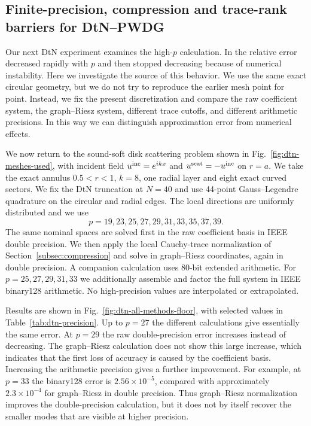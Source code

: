 \documentclass[pdflatex,sn-mathphys-num]{sn-jnl}
\theoremstyle{thmstyleone}
\theoremstyle{thmstyletwo}
\begin{document}
\subsection{Finite-precision, compression and trace-rank barriers for DtN--PWDG}\label{subsec:dtn-precision}
Our next DtN experiment examines the high-$p$ calculation.  In \cite{KapitaMonk2018} the relative error decreased rapidly with $p$ and then stopped decreasing because of numerical instability.  Here we investigate the source of this behavior.  We use the same exact circular geometry, but we do not try to reproduce the earlier mesh point for point.  Instead, we fix the present discretization and compare the raw coefficient system, the graph--Riesz system, different trace cutoffs, and different arithmetic precisions.  In this way we can distinguish approximation error from numerical effects.

We now return to the sound-soft disk scattering problem shown in Fig.~\ref{fig:dtn-meshes-used}, with incident field $u^{\rm inc}=e^{ikx}$ and $u^{\rm scat}=-u^{\rm inc}$ on $r=a$.  We take the exact annulus $0.5<r<1$, $k=8$, one radial layer and eight exact curved sectors.  We fix the DtN truncation at $N=40$ and use 44-point Gauss--Legendre quadrature on the circular and radial edges.  The local directions are uniformly distributed and we use
\[
 p=19,23,25,27,29,31,33,35,37,39.
\]
The same nominal spaces are solved first in the raw coefficient basis in IEEE double precision.  We then apply the local Cauchy-trace normalization of Section~\ref{subsec:compression} and solve in graph--Riesz coordinates, again in double precision.  A companion calculation uses 80-bit extended arithmetic.  For $p=25,27,29,31,33$ we additionally assemble and factor the full system in IEEE binary128 arithmetic.  No high-precision values are interpolated or extrapolated.

Results are shown in Fig.~\ref{fig:dtn-all-methods-floor}, with selected values in Table~\ref{tab:dtn-precision}.  Up to $p=27$ the different calculations give essentially the same error.  At $p=29$ the raw double-precision error increases instead of decreasing.  The graph--Riesz calculation does not show this large increase, which indicates that the first loss of accuracy is caused by the coefficient basis.  Increasing the arithmetic precision gives a further improvement.  For example, at $p=33$ the binary128 error is $2.56\times10^{-5}$, compared with approximately $2.3\times10^{-4}$ for graph--Riesz in double precision.  Thus graph--Riesz normalization improves the double-precision calculation, but it does not by itself recover the smaller modes that are visible at higher precision.
\end{document}

